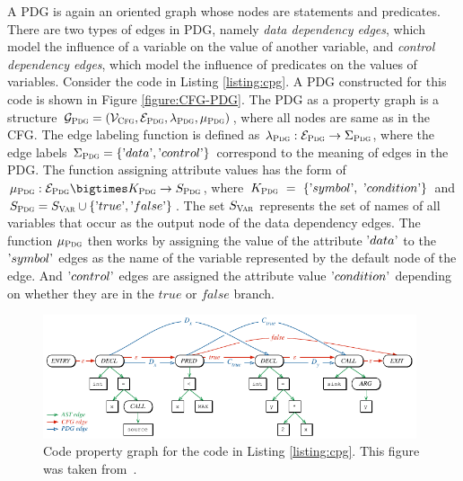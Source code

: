 A PDG \cite{CPG-yamaguchi2014modeling} is again an oriented graph whose nodes are statements and predicates. There are two types of edges in PDG, namely \textit{data dependency edges}, which model the influence of a variable on the value of another variable, and \textit{control dependency edges}, which model the influence of predicates on the values of variables. Consider the code in Listing \ref{listing:cpg}. A PDG constructed for this code is shown in Figure \ref{figure:CFG-PDG}. The PDG as a property graph is a structure $\mathcal{G}_{\textsc{Pdg}} = ( \mathcal{V}_{\textsc{Cfg}}, \mathcal{E}_{\textsc{Pdg}}, \lambda_{\textsc{Pdg}}, \mu_{\textsc{Pdg}} )$, where all nodes are same as in the CFG. The edge labeling function is defined as $\lambda_{\textsc{Pdg}} : \mathcal{E}_{\textsc{Pdg}} \rightarrow \Sigma_{\textsc{Pdg}}$, where the edge labels $\Sigma_{\textsc{Pdg}} = \{\textrm'data\textrm', \textrm'control\textrm'\}$ correspond to the meaning of edges in the PDG. The function assigning attribute values has the form of $\mu_{\textsc{Pdg}}: \mathcal{E_{\textsc{Pdg}}} \bigtimes K_{\textsc{Pdg}} \rightarrow S_{\textsc{Pdg}}$, where $K_{\textsc{Pdg}}~=~\{\textrm'symbol\textrm',~\textrm'condition\textrm'\}$ and $S_{\textsc{Pdg}} = S_{\textsc{Var}} \cup \{\textrm'true\textrm', \textrm'false\textrm'\} $. The set $S_{\textsc{Var}}$ represents the set of names of all variables that occur as the output node of the data dependency edges. The function $\mu_{\textsc{Pdg}}$ then works by assigning the value of the attribute $\textrm'data\textrm'$ to the $\textrm'symbol\textrm'$ edges as the name of the variable represented by the default node of the edge. And $\textrm'control\textrm'$ edges are assigned the attribute value $\textrm'condition\textrm'$ depending on whether they are in the $true$ or $false$ branch. 

\begin{figure}[hbt]
	\centering
	\includegraphics[width=0.98\textwidth]{figures/CPG.pdf}
	\caption{Code property graph for the code in Listing \ref{listing:cpg}. This figure was taken from~\cite{CPG-yamaguchi2014modeling}.}
	\label{figure:CPG}
\end{figure}

